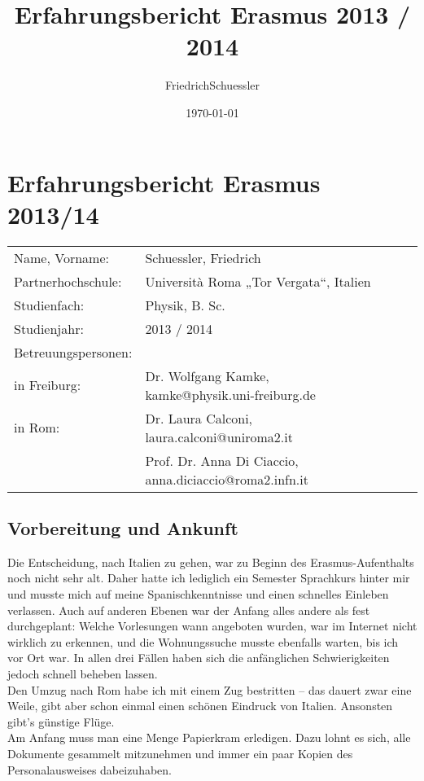 \documentclass[a4paper,12pt]{article}
\newcommand{\Jahr}{2013 / 2014}          %
\newcommand{\Datum}{\today}            %
\newcommand{\Abschluss}{B. Sc.}
\newcommand{\Studienfach}{Physik}
\newcommand{\Nachname}{Schuessler}
\newcommand{\Vorname}{Friedrich}
\begin{document}
 
\title{Erfahrungsbericht Erasmus \Jahr}
\author{\Vorname \Nachname}
\date{\Datum}
 
\section*{Erfahrungsbericht Erasmus 2013/14}
\begin{tabularx}{\textwidth}{@{}llllX}
Name, Vorname:   & \Nachname, \Vorname \\
Partnerhochschule:	& Università Roma „Tor Vergata“, Italien  \\
Studienfach:         & \Studienfach, \Abschluss \\
Studienjahr:	& \Jahr \\
Betreuungspersonen: & \\
in Freiburg: & Dr. Wolfgang Kamke, kamke@physik.uni-freiburg.de \\
in Rom:	& Dr. Laura Calconi, laura.calconi@uniroma2.it \\
		& Prof. Dr. Anna Di Ciaccio, anna.diciaccio@roma2.infn.it \\
\end{tabularx}
 
\subsection*{Vorbereitung und Ankunft}
Die Entscheidung, nach Italien zu gehen, war zu Beginn des Erasmus-Aufenthalts noch nicht sehr alt. Daher hatte ich lediglich ein Semester Sprachkurs hinter mir und musste mich auf meine Spanischkenntnisse und einen schnelles Einleben verlassen. Auch auf anderen Ebenen war der Anfang alles andere als fest durchgeplant: Welche Vorlesungen wann angeboten wurden, war im Internet nicht wirklich zu erkennen, und die Wohnungssuche musste ebenfalls warten, bis ich vor Ort war. In allen drei Fällen haben sich die anfänglichen Schwierigkeiten jedoch schnell beheben lassen. \\
Den Umzug nach Rom habe ich mit einem Zug bestritten – das dauert zwar eine Weile, gibt aber schon einmal einen schönen Eindruck von Italien. Ansonsten gibt’s günstige Flüge. \\
Am Anfang muss man eine Menge Papierkram erledigen. Dazu lohnt es sich, alle Dokumente gesammelt mitzunehmen und immer ein paar Kopien des Personalausweises dabeizuhaben.
\end{document}
